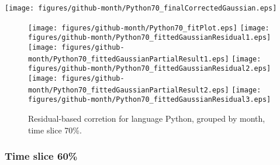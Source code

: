 \begin{center}
{\texttt{[image: figures/github-month/Python70\_finalCorrectedGaussian.eps]}}
\end{center}

\FloatBarrier

\begin{figure}[t]
\centering
{}
{\texttt{[image: figures/github-month/Python70\_fitPlot.eps]}}
{\texttt{[image: figures/github-month/Python70\_fittedGaussianResidual1.eps]}}
{\texttt{[image: figures/github-month/Python70\_fittedGaussianPartialResult1.eps]}}
{\texttt{[image: figures/github-month/Python70\_fittedGaussianResidual2.eps]}}
{\texttt{[image: figures/github-month/Python70\_fittedGaussianPartialResult2.eps]}}
{\texttt{[image: figures/github-month/Python70\_fittedGaussianResidual3.eps]}}
\caption{Residual-based corretion for language Python, grouped by month, time slice 70\%.}
\end{figure}


\FloatBarrier


\subsubsection{Time slice 60\%}

